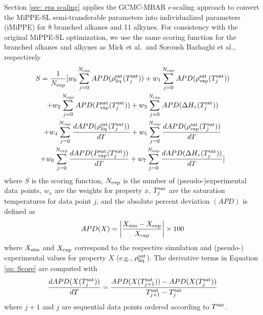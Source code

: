\documentclass[journal=jced,manuscript=article]{achemso}
\begin{document}
Section \ref{sec: eps scaling} applies the GCMC-MBAR $\epsilon$-scaling approach to convert the MiPPE-SL semi-transferable parameters into individualized parameters (iMiPPE) for 8 branched alkanes and 11 alkynes. For consistency with the original MiPPE-SL optimization, we use the same scoring function for the branched alkanes and alkynes as Mick et al.~and Soroush Barhaghi et al., respectively
\begin{multline} \label{eq: Score}
S= \frac{1}{N_{\rm exp}} [ w_0 \sum_{j=0}^{N_{\rm exp}} APD(\rho_{\rm liq}^{\rm sat}(T^{\rm sat}_j)) + w_1 \sum_{j=0}^{N_{\rm exp}} APD(\rho_{\rm vap}^{\rm sat}(T^{\rm sat}_j)) \\ + w_2 \sum_{j=0}^{N_{\rm exp}} APD(P_{\rm vap}^{\rm sat}(T^{\rm sat}_j)) + w_3 \sum_{j=0}^{N_{\rm exp}} APD(\Delta H_{\rm v} (T^{\rm sat}_j)) \\ + w_4 \sum_{j=0}^{N_{\rm exp}} \frac{d APD(\rho_{\rm liq}^{\rm sat}(T^{\rm sat}_j))}{dT} + w_5 \sum_{j=0}^{N_{\rm exp}} \frac{d APD(\rho_{\rm vap}^{\rm sat}(T^{\rm sat}_j))}{dT} \\ + w_6 \sum_{j=0}^{N_{\rm exp}} \frac{d APD(P_{\rm vap}^{\rm sat}(T^{\rm sat}_j))}{dT} + w_7 \sum_{j=0}^{N_{\rm exp}} \frac{d APD(\Delta H_{\rm v} (T^{\rm sat}_j))}{dT} ]
\end{multline}
where $S$ is the scoring function, $N_{\rm exp}$ is the number of (pseudo-)experimental data points, $w_{x}$ are the weights for property $x$, $T^{\rm sat}_j$ are the saturation temperatures for data point $j$, and the absolute percent deviation $(APD)$ is defined as
\begin{equation} \label{eq: APD}
APD(X) = \left| \frac{X_{\rm sim} - X_{\rm exp}}{X_{\rm exp}} \right| \times 100 
\end{equation}
where $X_{\rm sim}$ and $X_{\rm exp}$ correspond to the respective simulation and (pseudo-) experimental values for property $X$ (e.g., $\rho_{\rm liq}^{\rm sat}$). The derivative terms in Equation \ref{eq: Score} are computed with
\begin{equation}
\frac{d APD(X(T^{\rm sat}_{j}))}{dT} = \frac{APD(X(T^{\rm sat}_{j+1}))-APD(X(T^{\rm sat}_{j}))}{T^{\rm sat}_{j+1} - T^{\rm sat}_j}
\end{equation}
where $j+1$ and $j$ are sequential data points ordered according to $T^{\rm sat}$.
\end{document}
